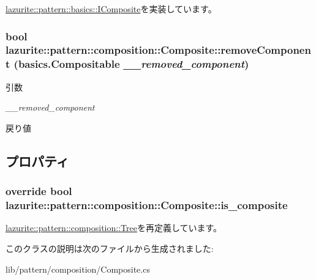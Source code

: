 \hyperlink{interfacelazurite_1_1pattern_1_1basics_1_1_i_composite_a81b5f73ea025b82e6e86474d8b426a4a}{lazurite::pattern::basics::IComposite}を実装しています。\hypertarget{classlazurite_1_1pattern_1_1composition_1_1_composite_a22844ad840310dcc0952756e45faf5f1}{
\subsubsection[{removeComponent}]{\setlength{\rightskip}{0pt plus 5cm}bool lazurite::pattern::composition::Composite::removeComponent ({\bf basics.Compositable} {\em \_\-\_\-removed\_\-component})}}
\label{classlazurite_1_1pattern_1_1composition_1_1_composite_a22844ad840310dcc0952756e45faf5f1}

\begin{DoxyParams}{引数}
\item[{\em \_\-\_\-removed\_\-component}]\end{DoxyParams}
\begin{DoxyReturn}{戻り値}

\end{DoxyReturn}


\subsection{プロパティ}
\hypertarget{classlazurite_1_1pattern_1_1composition_1_1_composite_a38ec1a6e088e9831d4e3045d0741f7cb}{
\subsubsection[{is\_\-composite}]{\setlength{\rightskip}{0pt plus 5cm}override bool lazurite::pattern::composition::Composite::is\_\-composite}}
\label{classlazurite_1_1pattern_1_1composition_1_1_composite_a38ec1a6e088e9831d4e3045d0741f7cb}


\hyperlink{classlazurite_1_1pattern_1_1composition_1_1_tree_a292230ac66f50163b23b306d698ad511}{lazurite::pattern::composition::Tree}を再定義しています。

このクラスの説明は次のファイルから生成されました:\begin{DoxyCompactItemize}
\item 
lib/pattern/composition/Composite.cs\end{DoxyCompactItemize}
